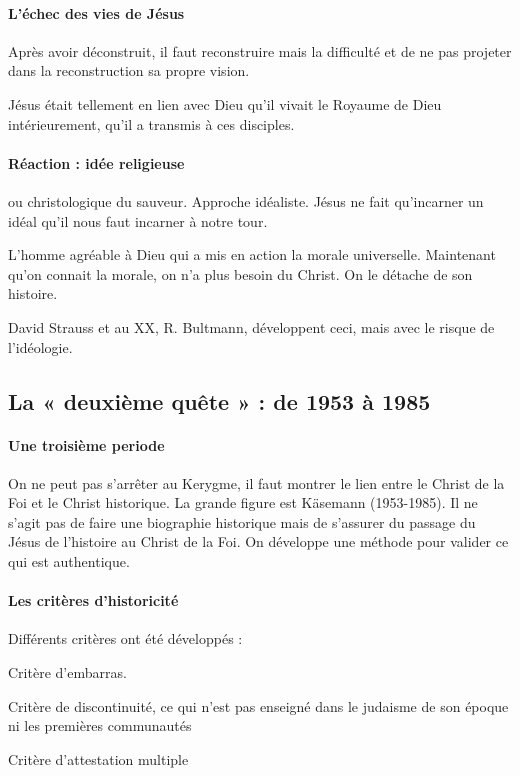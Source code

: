 \paragraph{L'échec des vies de Jésus} Après avoir déconstruit, il faut reconstruire mais la difficulté et de ne pas projeter dans la reconstruction sa propre vision. 
\begin{Ex}
Jésus était tellement en lien avec Dieu qu'il vivait le Royaume de Dieu intérieurement, qu'il a transmis à ces disciples.
\end{Ex}

\paragraph{Réaction : idée religieuse} ou christologique du sauveur. Approche idéaliste. Jésus  ne fait qu'incarner un idéal qu'il nous faut incarner à notre tour. 
\begin{Ex}[E Kant]
L'homme agréable à Dieu qui a mis en action la morale universelle. Maintenant qu'on connait la morale, on n'a plus besoin du Christ. On le détache de son histoire. 
\end{Ex}
David Strauss et au XX, R. Bultmann, développent ceci, mais avec le risque de l'idéologie. 


\subsection{La « deuxième quête » : de 1953 à 1985}

\paragraph{Une troisième periode} On ne peut pas s'arrêter au Kerygme, il faut montrer le lien entre le Christ de la Foi et le Christ historique. La grande figure est Käsemann (1953-1985). Il ne s'agit pas de faire une biographie historique mais de s'assurer du passage du Jésus de l'histoire au Christ de la Foi. On développe une méthode pour valider ce qui est authentique.

\paragraph{Les critères d'historicité}
\begin{Prop}
Différents critères ont été développés : 
\bi
\item Critère d'embarras. 
\item Critère de discontinuité, ce qui n'est pas enseigné dans le judaisme de son époque ni les premières communautés 
\item Critère d'attestation multiple 
\ei 
\end{Prop}




